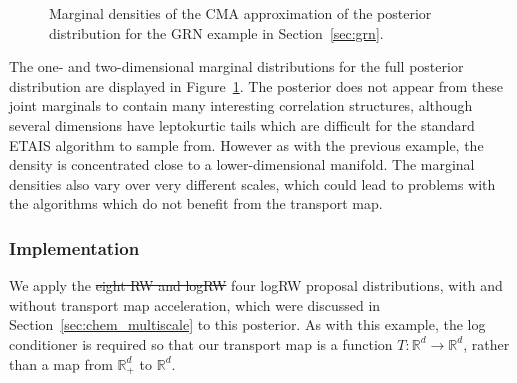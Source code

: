 \documentclass[final]{siamltex}
\newcommand{\edit}[1]{{\color{red} #1}}  %
\providecommand{\DIFdel}[1]{{\protect\color{red}\sout{#1}}}                      %
\providecommand{\DIFaddbegin}{} %
\providecommand{\DIFaddend}{} %
\providecommand{\DIFdelbegin}{} %
\providecommand{\DIFdelend}{} %
\newcommand{\DIFscaledelfig}{0.5}
\newlength{\DIFdelgraphicswidth} %
\newlength{\DIFdelgraphicsheight} %
\newcommand{\DIFaddincludegraphics}[2][]{{\color{blue}\fbox{\DIFOincludegraphics[#1]{#2}}}} %
\newcommand{\DIFdelincludegraphics}[2][]{%
\sbox{\DIFdelgraphicsbox}{\DIFOincludegraphics[#1]{#2}}%
\settoboxwidth{\DIFdelgraphicswidth}{\DIFdelgraphicsbox} %
\settoboxtotalheight{\DIFdelgraphicsheight}{\DIFdelgraphicsbox} %
\scalebox{\DIFscaledelfig}{%
\parbox[b]{\DIFdelgraphicswidth}{\usebox{\DIFdelgraphicsbox}\\[-\baselineskip] \rule{\DIFdelgraphicswidth}{0em}}\llap{\resizebox{\DIFdelgraphicswidth}{\DIFdelgraphicsheight}{%
\setlength{\unitlength}{\DIFdelgraphicswidth}%
\begin{picture}(1,1)%
\thicklines\linethickness{2pt} %
{\color[rgb]{1,0,0}\put(0,0){\framebox(1,1){}}}%
{\color[rgb]{1,0,0}\put(0,0){\line( 1,1){1}}}%
{\color[rgb]{1,0,0}\put(0,1){\line(1,-1){1}}}%
\end{picture}%
}\hspace*{3pt}}} %
} %
\DeclareRobustCommand{\DIFaddbegin}{\DIFOaddbegin \let\includegraphics\DIFaddincludegraphics} %
\DeclareRobustCommand{\DIFaddend}{\DIFOaddend \let\includegraphics\DIFOincludegraphics} %
\DeclareRobustCommand{\DIFdelbegin}{\DIFOdelbegin \let\includegraphics\DIFdelincludegraphics} %
\DeclareRobustCommand{\DIFdelend}{\DIFOaddend \let\includegraphics\DIFOincludegraphics} %
\begin{document}
\begin{figure}[htb]
\centering
{}%
\caption{Marginal densities of the CMA approximation of the posterior
  distribution for the GRN example in Section~\ref{sec:grn}.}
\label{fig:GRN_posterior}
\end{figure}

The one- and two-dimensional marginal distributions for the full
posterior distribution are displayed in
Figure~\ref{fig:GRN_posterior}. The posterior does not appear from
these joint marginals to contain many
interesting correlation structures, although several dimensions have
leptokurtic tails which are difficult for the standard ETAIS algorithm
to sample from. However as with the previous example, the density is
concentrated close to a lower-dimensional manifold. The marginal densities also vary over very different
scales, which could lead to problems with the algorithms which do not
benefit from the transport map.

\subsubsection{Implementation}

We apply the \DIFdelbegin \DIFdel{eight RW and logRW }\DIFdelend \DIFaddbegin \edit{four logRW} \DIFaddend proposal distributions, with and
without transport map acceleration, which were discussed in
Section~\ref{sec:chem_multiscale} to this posterior. As with this
example, the log conditioner is required so that our transport map is a function $T\colon\mathbb{R}^d\rightarrow\mathbb{R}^d$, rather than a map from $\mathbb{R}_+^d$ to $\mathbb{R}^d$.
\end{document}
